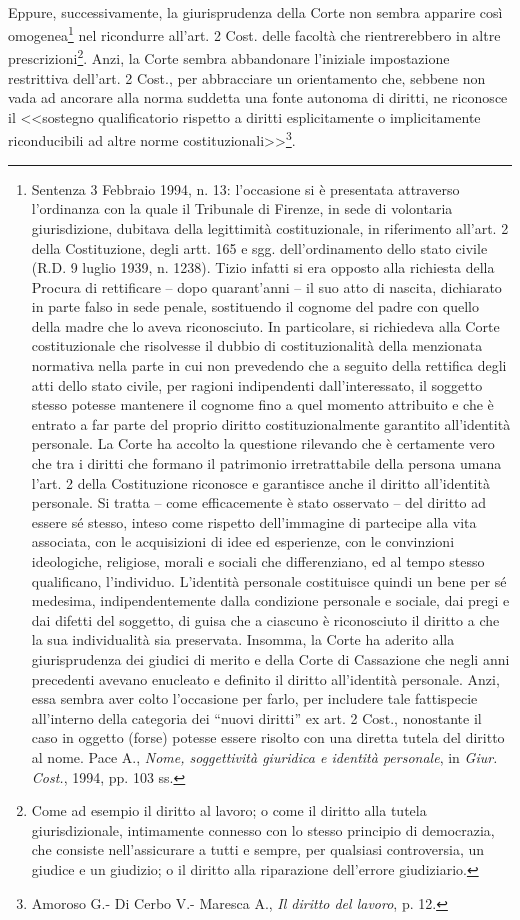 \\Eppure, successivamente, la giurisprudenza della Corte non sembra apparire così omogenea\footnote{Sentenza 3 Febbraio 1994, n. 13: l’occasione si è presentata attraverso l’ordinanza con la quale il Tribunale di Firenze, in sede di volontaria giurisdizione, dubitava della legittimità costituzionale, in riferimento all’art. 2 della Costituzione, degli artt. 165 e sgg. dell'ordinamento dello stato civile (R.D. 9 luglio 1939, n. 1238). Tizio infatti si era opposto alla richiesta della Procura di rettificare – dopo quarant’anni – il suo atto di nascita, dichiarato in parte falso in sede penale, sostituendo il cognome del padre con quello della madre che lo aveva riconosciuto. In particolare, si richiedeva alla Corte costituzionale che risolvesse il dubbio di costituzionalità della menzionata normativa nella parte in cui non prevedendo che a seguito della rettifica degli atti dello stato civile, per ragioni indipendenti dall'interessato, il soggetto stesso potesse mantenere il cognome fino a quel momento attribuito e che è entrato a far parte del proprio diritto costituzionalmente garantito all'identità personale. La Corte ha accolto la questione rilevando che è certamente vero che tra i diritti che formano il patrimonio irretrattabile della persona umana l'art. 2 della Costituzione riconosce e garantisce anche il diritto all'identità personale. Si tratta – come efficacemente è stato osservato – del diritto ad essere sé stesso, inteso come rispetto dell'immagine di partecipe alla vita associata, con le acquisizioni di idee ed esperienze, con le convinzioni ideologiche, religiose, morali e sociali che differenziano, ed al tempo stesso qualificano, l'individuo. L'identità personale costituisce quindi un bene per sé medesima, indipendentemente dalla condizione personale e sociale, dai pregi e dai difetti del soggetto, di guisa che a ciascuno è riconosciuto il diritto a che la sua individualità sia preservata. Insomma, la Corte ha aderito alla giurisprudenza dei giudici di merito e della Corte di Cassazione che negli anni precedenti avevano enucleato e definito il diritto all’identità personale. Anzi, essa sembra aver colto l’occasione per farlo, per includere tale fattispecie all’interno della categoria dei “nuovi diritti” ex art. 2 Cost., nonostante il caso in oggetto (forse) potesse essere risolto con una diretta tutela del diritto al nome. Pace A., \textit{Nome, soggettività giuridica e identità personale}, in \textit{Giur. Cost.}, 1994, pp. 103 ss.} nel ricondurre all’art. 2 Cost. delle facoltà che rientrerebbero in altre prescrizioni\footnote{Come ad esempio il diritto al lavoro; o come il diritto alla tutela giurisdizionale, intimamente connesso con lo stesso principio di democrazia, che consiste nell’assicurare a tutti e sempre, per qualsiasi controversia, un giudice e un giudizio; o il diritto alla riparazione dell’errore giudiziario.}. Anzi, la Corte sembra abbandonare l’iniziale impostazione restrittiva dell’art. 2 Cost., per abbracciare un orientamento che, sebbene non vada ad ancorare alla norma suddetta una fonte autonoma di diritti, ne riconosce il <<sostegno qualificatorio rispetto a diritti esplicitamente o implicitamente riconducibili ad altre norme costituzionali>>\footnote{Amoroso G.- Di Cerbo V.- Maresca A., \textit{Il diritto del lavoro}, p. 12.}.

